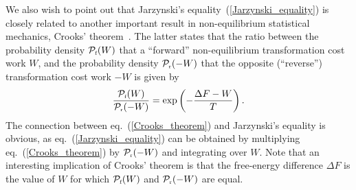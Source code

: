 \documentclass[11pt]{article}
\begin{document}
We also wish to point out that Jarzynski's equality~(\ref{Jarzynski_equality}) is closely related to another important result in non-equilibrium statistical mechanics, Crooks' theorem~\cite{Crooks:1997ne, Crooks:1999ep}. The latter states that the ratio between the probability density $\mathcal{P}_{\mbox{\tiny{f}}}(W)$ that a ``forward'' non-equilibrium transformation cost work $W$, and the probability density $\mathcal{P}_{\mbox{\tiny{r}}}(-W)$ that the opposite (``reverse'') transformation cost work $-W$ is given by
\begin{equation}
\label{Crooks_theorem}
\frac{\mathcal{P}_{\mbox{\tiny{f}}}(W)}{\mathcal{P}_{\mbox{\tiny{r}}}(-W)} = \exp \left( - \frac{\Delta F - W}{T} \right) .
\end{equation}
The connection between eq.~(\ref{Crooks_theorem}) and Jarzynski's equality is obvious, as eq.~(\ref{Jarzynski_equality}) can be obtained by multiplying eq.~(\ref{Crooks_theorem}) by $\mathcal{P}_{\mbox{\tiny{r}}}(-W)$ and integrating over $W$. Note that an interesting implication of Crooks' theorem is that the free-energy difference $\Delta F$ is the value of $W$ for which $\mathcal{P}_{\mbox{\tiny{f}}}(W)$ and $\mathcal{P}_{\mbox{\tiny{r}}}(-W)$ are equal.
\end{document}
